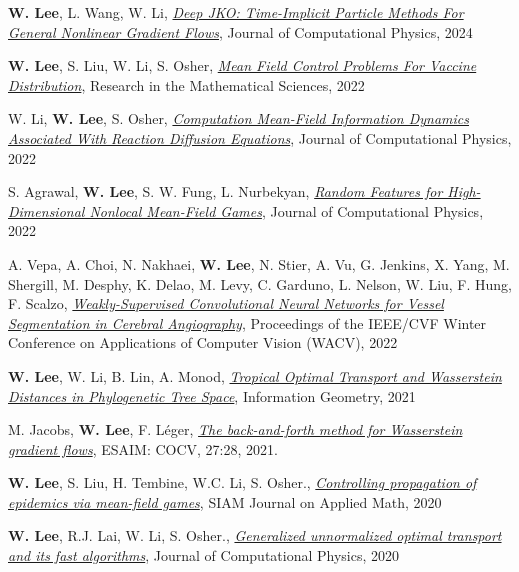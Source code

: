\begin{cvparagraph}
\begin{cvitems}
    \medskip
  \item \textbf{W. Lee}, L. Wang, W. Li, \href{https://arxiv.org/abs/2311.06700}{\textit{Deep JKO: Time-Implicit Particle Methods For General Nonlinear Gradient Flows}}, Journal of Computational Physics, 2024
    \medskip
  \item \textbf{W. Lee}, S. Liu, W. Li, S. Osher, \href{https://arxiv.org/pdf/2104.11887.pdf}{\textit{Mean Field Control Problems For Vaccine Distribution}}, Research in the Mathematical Sciences, 2022
    \medskip
    \item W. Li, \textbf{W. Lee}, S. Osher, \href{https://arxiv.org/pdf/2107.11501.pdf}{\textit{Computation Mean-Field Information Dynamics Associated With Reaction Diffusion Equations}}, Journal of Computational Physics, 2022
    \medskip
    \item S. Agrawal, \textbf{W. Lee}, S. W. Fung, L. Nurbekyan, \href{https://arxiv.org/abs/2202.12529}{\textit{Random Features for High-Dimensional Nonlocal Mean-Field Games}}, Journal of Computational Physics, 2022
    \medskip
    \item A. Vepa, A. Choi, N. Nakhaei, \textbf{W. Lee}, N. Stier, A. Vu, G. Jenkins, X. Yang, M. Shergill, M. Desphy, K. Delao, M. Levy, C. Garduno, L. Nelson, W. Liu, F. Hung, F. Scalzo, \href{https://openaccess.thecvf.com/content/WACV2022/html/Vepa_Weakly-Supervised_Convolutional_Neural_Networks_for_Vessel_Segmentation_in_Cerebral_Angiography_WACV_2022_paper.html}{\textit{Weakly-Supervised Convolutional Neural Networks for Vessel Segmentation in Cerebral Angiography}}, Proceedings of the IEEE/CVF Winter Conference on Applications of Computer Vision (WACV), 2022
    \medskip
    \item \textbf{W. Lee}, W. Li, B. Lin, A. Monod, \href{https://arxiv.org/pdf/1911.05401v1.pdf}{\textit{Tropical Optimal Transport and Wasserstein Distances in Phylogenetic Tree Space}}, {Information Geometry}, 2021
    \medskip
    \item M. Jacobs, \textbf{W. Lee}, F. Léger, \href{https://arxiv.org/pdf/2011.08151}{\textit{The back-and-forth method for Wasserstein gradient flows}}, {ESAIM: COCV}, 27:28, 2021.
    \medskip
    \item \textbf{W. Lee}, S. Liu, H. Tembine, W.C. Li, S. Osher., \href{https://www.researchgate.net/publication/341804278_Controlling_Propagation_of_epidemics_via_mean-field_games}{\textit{Controlling propagation of epidemics via mean-field games}}, {SIAM Journal on Applied Math}, 2020
    \medskip
    \item \textbf{W. Lee}, R.J. Lai, W. Li, S. Osher., \href{https://www.researchgate.net/publication/338990122_Generalized_Unnormalized_Optimal_Transport_and_its_fast_algorithms}{\textit{Generalized unnormalized optimal transport and its fast algorithms}}, {Journal of Computational Physics}, 2020

\end{cvitems}
\end{cvparagraph}
